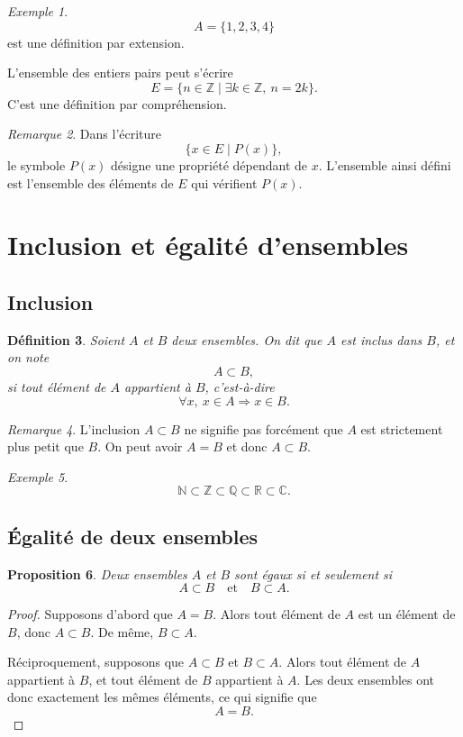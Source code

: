 \documentclass[11pt,a4paper]{article}
\newtheorem{definition}{Définition}[section]
\newtheorem{proposition}[definition]{Proposition}
\theoremstyle{remark}
\newtheorem{remarque}[definition]{Remarque}
\newtheorem{exemple}[definition]{Exemple}
\newcommand{\R}{\mathbb{R}}
\newcommand{\N}{\mathbb{N}}
\newcommand{\Z}{\mathbb{Z}}
\newcommand{\Q}{\mathbb{Q}}
\newcommand{\C}{\mathbb{C}}
\begin{document}
\begin{exemple}
\[
A=\{1,2,3,4\}
\]
est une définition par extension.

L’ensemble des entiers pairs peut s’écrire
\[
E=\{n\in\Z \mid \exists k\in\Z,\ n=2k\}.
\]
C’est une définition par compréhension.
\end{exemple}

\begin{remarque}
Dans l’écriture
\[
\{x\in E \mid P(x)\},
\]
le symbole \(P(x)\) désigne une propriété dépendant de \(x\). L’ensemble ainsi défini est l’ensemble des éléments de \(E\) qui vérifient \(P(x)\).
\end{remarque}

\section{Inclusion et égalité d’ensembles}

\subsection{Inclusion}

\begin{definition}
Soient \(A\) et \(B\) deux ensembles. On dit que \(A\) est inclus dans \(B\), et on note
\[
A\subset B,
\]
si tout élément de \(A\) appartient à \(B\), c’est-à-dire
\[
\forall x,\ x\in A \Longrightarrow x\in B.
\]
\end{definition}

\begin{remarque}
L’inclusion \(A\subset B\) ne signifie pas forcément que \(A\) est strictement plus petit que \(B\). On peut avoir \(A=B\) et donc \(A\subset B\).
\end{remarque}

\begin{exemple}
\[
\N\subset \Z\subset \Q\subset \R\subset \C.
\]
\end{exemple}

\subsection{Égalité de deux ensembles}

\begin{proposition}
Deux ensembles \(A\) et \(B\) sont égaux si et seulement si
\[
A\subset B
\quad \text{et} \quad
B\subset A.
\]
\end{proposition}

\begin{proof}
Supposons d’abord que \(A=B\). Alors tout élément de \(A\) est un élément de \(B\), donc \(A\subset B\). De même, \(B\subset A\).

Réciproquement, supposons que \(A\subset B\) et \(B\subset A\). Alors tout élément de \(A\) appartient à \(B\), et tout élément de \(B\) appartient à \(A\). Les deux ensembles ont donc exactement les mêmes éléments, ce qui signifie que
\[
A=B.
\]
\end{proof}
\end{document}
